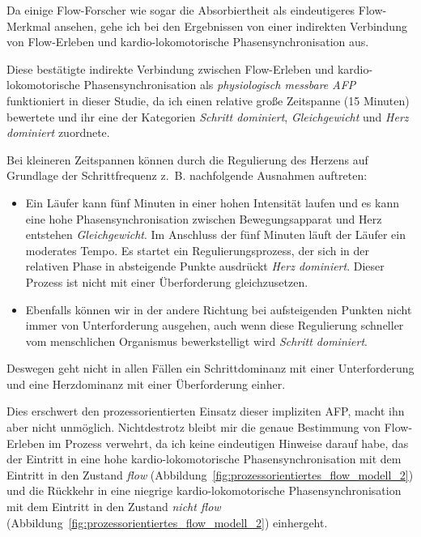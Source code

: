 Da einige Flow-Forscher wie \cite{Peifer2014} sogar die Absorbiertheit als eindeutigeres Flow-Merkmal ansehen, gehe ich bei den Ergebnissen von einer indirekten Verbindung von Flow-Erleben und kardio-lokomotorische Phasensynchronisation aus. 

Diese bestätigte indirekte Verbindung zwischen Flow-Erleben und kardio-lokomotorische Phasensynchronisation als \emph{physiologisch messbare \ac{AFP}} funktioniert in dieser Studie, da ich einen relative große Zeitspanne (15 Minuten) bewertete und ihr eine der Kategorien \emph{Schritt dominiert}, \emph{Gleichgewicht} und \emph{Herz dominiert} zuordnete.

Bei kleineren Zeitspannen können durch die Regulierung des Herzens auf Grundlage der Schrittfrequenz z.~B. nachfolgende Ausnahmen auftreten: 
\begin{itemize}
	
	\item Ein Läufer kann fünf Minuten in einer hohen Intensität laufen und es kann eine hohe Phasensynchronisation zwischen Bewegungsapparat und Herz entstehen \emph{Gleichgewicht}. Im Anschluss der fünf Minuten läuft der Läufer ein moderates Tempo. Es startet ein Regulierungsprozess, der sich in der relativen Phase in absteigende Punkte ausdrückt \emph{Herz dominiert}. Dieser Prozess ist nicht mit einer Überforderung gleichzusetzen.
	
	\item Ebenfalls können wir in der andere Richtung bei aufsteigenden Punkten nicht immer von Unterforderung ausgehen, auch wenn diese Regulierung schneller vom menschlichen Organismus bewerkstelligt wird \emph{Schritt dominiert}.
\end{itemize}

Deswegen geht nicht in allen Fällen ein Schrittdominanz mit einer Unterforderung und eine Herzdominanz mit einer Überforderung einher. 

Dies erschwert den prozessorientierten Einsatz dieser impliziten \ac{AFP}, macht ihn aber nicht unmöglich. Nichtdestrotz bleibt mir die genaue Bestimmung von Flow-Erleben im Prozess verwehrt, da ich keine eindeutigen Hinweise darauf habe, das der Eintritt in eine hohe kardio-lokomotorische Phasensynchronisation mit dem Eintritt in den Zustand \emph{flow} (Abbildung~\ref{fig:prozessorientiertes_flow_modell_2}) und die Rückkehr in eine niegrige kardio-lokomotorische Phasensynchronisation mit dem Eintritt in den Zustand \emph{nicht flow} (Abbildung~\ref{fig:prozessorientiertes_flow_modell_2}) einhergeht. 

